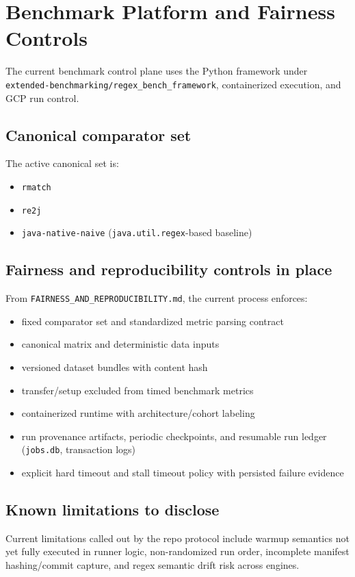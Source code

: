 \documentclass[11pt]{article}
\begin{document}
\section{Benchmark Platform and Fairness Controls}
The current benchmark control plane uses the Python framework under \texttt{extended-benchmarking/regex\_bench\_framework}, containerized execution, and GCP run control.

\subsection{Canonical comparator set}
The active canonical set is:
\begin{itemize}
  \item \texttt{rmatch}
  \item \texttt{re2j}
  \item \texttt{java-native-naive} (\texttt{java.util.regex}-based baseline)
\end{itemize}

\subsection{Fairness and reproducibility controls in place}
From \texttt{FAIRNESS\_AND\_REPRODUCIBILITY.md}, the current process enforces:
\begin{itemize}
  \item fixed comparator set and standardized metric parsing contract
  \item canonical matrix and deterministic data inputs
  \item versioned dataset bundles with content hash
  \item transfer/setup excluded from timed benchmark metrics
  \item containerized runtime with architecture/cohort labeling
  \item run provenance artifacts, periodic checkpoints, and resumable run ledger (\texttt{jobs.db}, transaction logs)
  \item explicit hard timeout and stall timeout policy with persisted failure evidence
\end{itemize}

\subsection{Known limitations to disclose}
Current limitations called out by the repo protocol include warmup semantics not yet fully executed in runner logic, non-randomized run order, incomplete manifest hashing/commit capture, and regex semantic drift risk across engines.
\end{document}
